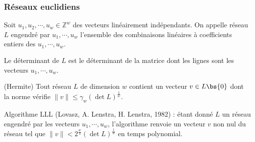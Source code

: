             \subsubsection{Réseaux euclidiens}
                \begin{defi}
                    Soit $u_1, u_2, \cdots, u_w \in \mathbb{Z}^w$  des vecteurs linéairement indépendants. On appelle réseau $L$ engendré par $u_1, \cdots, u_w$ l'ensemble des combinaisons linéaires à coefficients entiers des $u_1, \cdots, u_w$.
                \end{defi}
                \begin{defi}
                    Le déterminant de $L$ est le déterminant de la matrice dont les lignes sont les vecteurs $u_1, \cdots, u_w$.
                \end{defi}
                \begin{theo} (Hermite)
                    Tout réseau $L$ de dimension $w$ contient un vecteur $v \in L \bs \{0\}$ dont la norme vérifie $\|v\| \leq \gamma_w (\det L)^{\frac 1w}$.
                \end{theo}
                Algorithme LLL (Lovasz, A. Lenstra, H. Lenstra, 1982) : étant donné $L$ un réseau engendré par les vecteurs $u_1, \cdots, u_w$, l'algorithme renvoie un vecteur $v$ non nul du réseau tel que $\|v\| < 2^{\frac w4} (\det L)^{\frac 1w}$ en temps polynomial.

